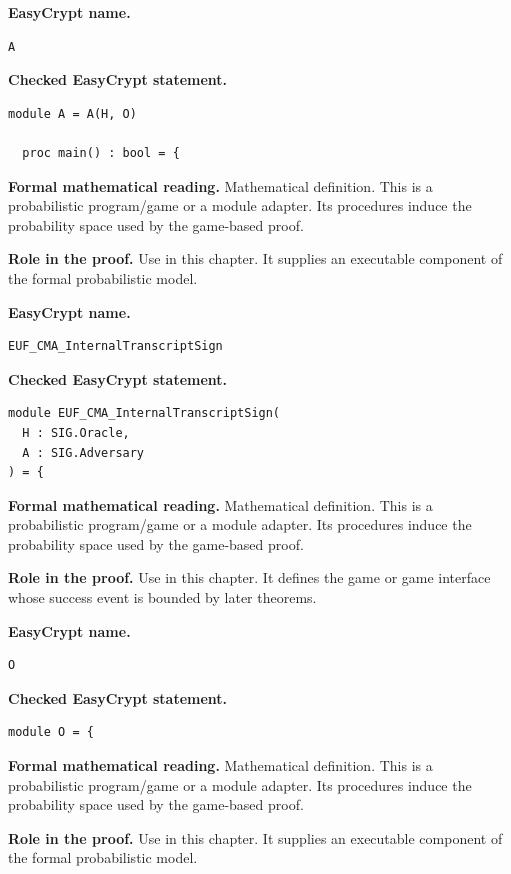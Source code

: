 \begin{formaldefinition}
\noindent\textbf{EasyCrypt name.}
\begin{lstlisting}[language=EasyCrypt,basicstyle=\ttfamily\scriptsize]
A
\end{lstlisting}
\noindent\textbf{Checked EasyCrypt statement.}
\begin{lstlisting}[language=EasyCrypt,basicstyle=\ttfamily\scriptsize]
module A = A(H, O)

  proc main() : bool = {
\end{lstlisting}
\noindent\textbf{Formal mathematical reading.}
Mathematical definition. This is a probabilistic program/game or a module adapter.  Its procedures induce the probability space used by the game-based proof.

\noindent\textbf{Role in the proof.}
Use in this chapter. It supplies an executable component of the formal probabilistic model.

\end{formaldefinition}

\begin{formaldefinition}
\noindent\textbf{EasyCrypt name.}
\begin{lstlisting}[language=EasyCrypt,basicstyle=\ttfamily\scriptsize]
EUF_CMA_InternalTranscriptSign
\end{lstlisting}
\noindent\textbf{Checked EasyCrypt statement.}
\begin{lstlisting}[language=EasyCrypt,basicstyle=\ttfamily\scriptsize]
module EUF_CMA_InternalTranscriptSign(
  H : SIG.Oracle,
  A : SIG.Adversary
) = {
\end{lstlisting}
\noindent\textbf{Formal mathematical reading.}
Mathematical definition. This is a probabilistic program/game or a module adapter.  Its procedures induce the probability space used by the game-based proof.

\noindent\textbf{Role in the proof.}
Use in this chapter. It defines the game or game interface whose success event is bounded by later theorems.

\end{formaldefinition}

\begin{formaldefinition}
\noindent\textbf{EasyCrypt name.}
\begin{lstlisting}[language=EasyCrypt,basicstyle=\ttfamily\scriptsize]
O
\end{lstlisting}
\noindent\textbf{Checked EasyCrypt statement.}
\begin{lstlisting}[language=EasyCrypt,basicstyle=\ttfamily\scriptsize]
module O = {
\end{lstlisting}
\noindent\textbf{Formal mathematical reading.}
Mathematical definition. This is a probabilistic program/game or a module adapter.  Its procedures induce the probability space used by the game-based proof.

\noindent\textbf{Role in the proof.}
Use in this chapter. It supplies an executable component of the formal probabilistic model.

\end{formaldefinition}


